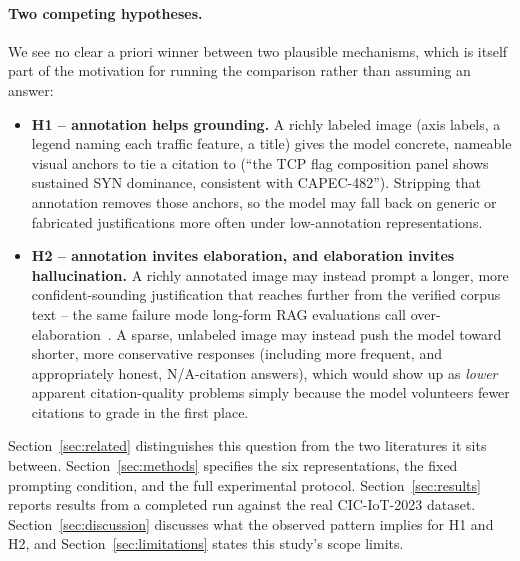 \documentclass[11pt]{article}
\begin{document}
\paragraph{Two competing hypotheses.} We see no clear a priori winner between two plausible
mechanisms, which is itself part of the motivation for running the comparison rather than assuming
an answer:

\begin{itemize}
\item \textbf{H1 -- annotation helps grounding.} A richly labeled image (axis labels, a legend
naming each traffic feature, a title) gives the model concrete, nameable visual anchors to tie a
citation to (``the TCP flag composition panel shows sustained SYN dominance, consistent with
CAPEC-482''). Stripping that annotation removes those anchors, so the model may fall back on
generic or fabricated justifications more often under low-annotation representations.
\item \textbf{H2 -- annotation invites elaboration, and elaboration invites hallucination.} A
richly annotated image may instead prompt a longer, more confident-sounding justification that
reaches further from the verified corpus text -- the same failure mode long-form RAG evaluations
call over-elaboration~\cite{factum2026}. A sparse, unlabeled image may instead push the model toward
shorter, more conservative responses (including more frequent, and appropriately honest,
N/A-citation answers), which would show up as \emph{lower} apparent citation-quality problems simply
because the model volunteers fewer citations to grade in the first place.
\end{itemize}

Section~\ref{sec:related} distinguishes this question from the two literatures it sits between.
Section~\ref{sec:methods} specifies the six representations, the fixed prompting condition, and the
full experimental protocol. Section~\ref{sec:results} reports results from a completed run against
the real CIC-IoT-2023 dataset. Section~\ref{sec:discussion} discusses what the observed pattern
implies for H1 and H2, and Section~\ref{sec:limitations} states this study's scope limits.
\end{document}
